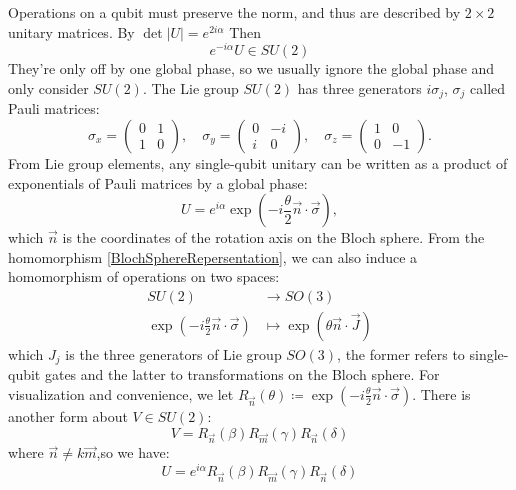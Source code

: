 \documentclass[a4paper,10pt]{article}
\numberwithin{equation}{subsection}
\begin{document}
Operations on a qubit must preserve the norm, and thus are described by $2\times2$ unitary matrices. By $\det|U|=e^{2i\alpha}$ Then
\begin{equation}
    e^{-i\alpha}U\in SU(2)
\end{equation}
They're only off by one global phase, so we usually ignore the global phase and only consider $SU(2)$. The Lie group $SU(2)$ has three generators $i\sigma_j$, $\sigma_j$ called Pauli matrices:
\begin{equation}
    \sigma_x = \begin{pmatrix} 0 & 1 \\ 1 & 0 \end{pmatrix}, \quad
    \sigma_y = \begin{pmatrix} 0 & -i \\ i & 0 \end{pmatrix}, \quad
    \sigma_z = \begin{pmatrix} 1 & 0 \\ 0 & -1 \end{pmatrix}.
\end{equation}
From Lie group elements, any single-qubit unitary can be written as a product of exponentials of Pauli matrices by a global phase:
\begin{equation}
    U = e^{i\alpha}\exp\left(-i\frac{\theta}{2}\vec{n}\cdot\vec{\sigma}\right),
\end{equation}
which $\vec{n}$ is the coordinates of the rotation axis on the Bloch sphere.
From the homomorphism \ref{BlochSphereRepersentation}, we can also induce a homomorphism of operations on two spaces:
\begin{equation}
    \begin{split}
        SU(2)                                                       & \to SO(3)
        \\
        \exp\left(-i\frac{\theta}{2}\vec{n}\cdot\vec{\sigma}\right) & \mapsto \exp\left(\theta\vec{n}\cdot\vec{J}\right)
    \end{split}
\end{equation}
which $J_{j}$ is the three generators of Lie group $SO(3)$, the former refers to single-qubit gates and the latter to transformations on the Bloch sphere. For visualization and convenience, we let $R_{\vec{n}}(\theta) \coloneqq \exp\left(-i\frac{\theta}{2}\vec{n}\cdot\vec{\sigma}\right)$. There is another form about $V\in SU(2)$:
\begin{equation}\label{EulerAngle}
    V=R_{\vec{n}}(\beta)R_{\vec{m}}(\gamma)R_{\vec{n}}(\delta)
\end{equation}
where $\vec{n}\neq k\vec{m}$,so we have:
\begin{equation}
    U=e^{i\alpha}R_{\vec{n}}(\beta)R_{\vec{m}}(\gamma)R_{\vec{n}}(\delta)
\end{equation}
\end{document}

